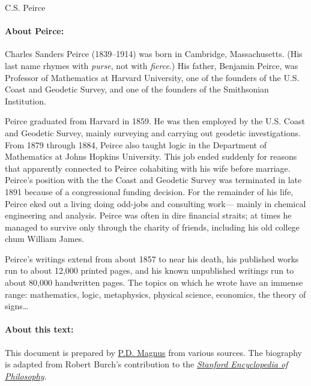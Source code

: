 \documentclass[12pt]{article}
\newcommand*{\authortitle}[1]{\centerline{\Huge\sc #1}}
\begin{document}
\authortitle{C.S. Peirce}

\bigskip

\paragraph{About Peirce:}
Charles Sanders Peirce (1839--1914) was born in Cambridge, Massachusetts. (His last name rhymes with \emph{purse}, not with \emph{fierce}.) His father, Benjamin Peirce, was Professor of Mathematics at Harvard University, one of the founders of the U.S. Coast and Geodetic Survey, and one of the founders of the Smithsonian Institution.

Peirce graduated from Harvard in 1859. He was then employed by the U.S. Coast and Geodetic Survey, mainly surveying and carrying out geodetic investigations. From 1879 through 1884, Peirce also taught logic in the Department of Mathematics at Johns Hopkins University. This job ended suddenly for reasons that apparently connected to Peirce cohabiting with his wife before marriage. Peirce's position with the the Coast and Geodetic Survey was terminated in late 1891 because of a congressional funding decision. For the remainder of his life, Peirce eked out a living doing odd-jobs and consulting work--- mainly in chemical engineering and analysis. Peirce was often in dire financial straits; at times he managed to survive only through the charity of friends, including his old college chum William James.

Peirce's writings extend from about 1857 to near his death, his published works run to about 12,000 printed pages, and his known unpublished writings run to about 80,000 handwritten pages. The topics on which he wrote have an immense range: mathematics, logic, metaphysics, physical science, economics, the theory of signs\ldots

\paragraph{About this text:}
This document is prepared by \href{https://www.fecundity.com}{P.D. Magnus} from various sources. The biography is adapted from Robert Burch's contribution to the \href{http://plato.stanford.edu}{\emph{Stanford Encyclopedia of Philosophy}}.





\end{document}
